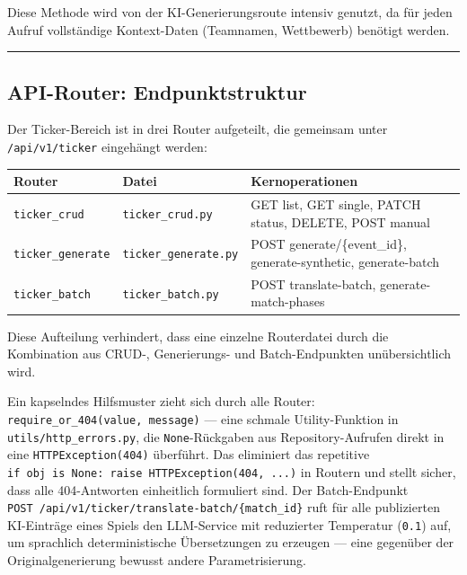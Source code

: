 Diese Methode wird von der KI-Generierungsroute intensiv genutzt, da für
jeden Aufruf vollständige Kontext-Daten (Teamnamen, Wettbewerb) benötigt
werden.

\begin{center}\rule{0.5\linewidth}{0.5pt}\end{center}

\subsection{API-Router:
Endpunktstruktur}\label{api-router-endpunktstruktur}

Der Ticker-Bereich ist in drei Router aufgeteilt, die gemeinsam unter
\texttt{/api/v1/ticker} eingehängt werden:

{\def\LTcaptype{none} %
\begin{longtable}[]{@{}
  >{\raggedright\arraybackslash}p{}
  >{\raggedright\arraybackslash}p{}
  >{\raggedright\arraybackslash}p{}@{}}
\toprule\noalign{}
\begin{minipage}[b]{\linewidth}\raggedright
Router
\end{minipage} & \begin{minipage}[b]{\linewidth}\raggedright
Datei
\end{minipage} & \begin{minipage}[b]{\linewidth}\raggedright
Kernoperationen
\end{minipage} \\
\midrule\noalign{}
\endhead
\bottomrule\noalign{}
\endlastfoot
\texttt{ticker\_crud} & \texttt{ticker\_crud.py} & GET list, GET single,
PATCH status, DELETE, POST manual \\
\texttt{ticker\_generate} & \texttt{ticker\_generate.py} & POST
generate/\{event\_id\}, generate-synthetic, generate-batch \\
\texttt{ticker\_batch} & \texttt{ticker\_batch.py} & POST
translate-batch, generate-match-phases \\
\end{longtable}
}

Diese Aufteilung verhindert, dass eine einzelne Routerdatei durch die
Kombination aus CRUD-, Generierungs- und Batch-Endpunkten
unübersichtlich wird.

Ein kapselndes Hilfsmuster zieht sich durch alle Router:
\texttt{require\_or\_404(value,\ message)} --- eine schmale
Utility-Funktion in \texttt{utils/http\_errors.py}, die
\texttt{None}-Rückgaben aus Repository-Aufrufen direkt in eine
\texttt{HTTPException(404)} überführt. Das eliminiert das repetitive
\texttt{if\ obj\ is\ None:\ raise\ HTTPException(404,\ ...)} in Routern
und stellt sicher, dass alle 404-Antworten einheitlich formuliert sind.
Der Batch-Endpunkt
\texttt{POST\ /api/v1/ticker/translate-batch/\{match\_id\}} ruft für
alle publizierten KI-Einträge eines Spiels den LLM-Service mit
reduzierter Temperatur (\texttt{0.1}) auf, um sprachlich
deterministische Übersetzungen zu erzeugen --- eine gegenüber der
Originalgenerierung bewusst andere Parametrisierung.

